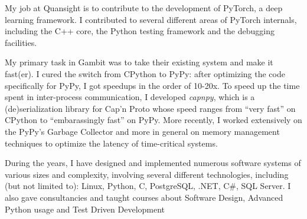 \documentclass[11pt,a4paper]{moderncv}
\begin{document}
 {My job at Quansight is to
  contribute to the development of PyTorch, a deep learning framework. I
  contributed to several different areas of PyTorch internals, including the
  C++ core, the Python testing framework and the debugging facilities.}

 {My primary task in
  Gambit was to take their existing system and make it fast(er).  I cured the
  switch from CPython to PyPy: after optimizing the code specifically for
  PyPy, I got speedups in the order of 10-20x.  To speed up the time spent in
  inter-process communication, I developed \emph{capnpy}, which is a
  (de)serialization library for Cap'n Proto whose speed ranges from ``very
  fast'' on CPython to ``embarassingly fast'' on PyPy.  More recently, I
  worked extensively on the PyPy's Garbage Collector and more in general on
  memory management techniques to optimize the latency of time-critical
  systems.}

 {During the years, I have designed and implemented numerous
  software systems of various sizes and complexity, involving several
  different technologies, including (but not limited to): Linux, Python, C,
  PostgreSQL, .NET, C\#, SQL Server.  I also gave consultancies and taught
  courses about Software Design, Advanced Python usage and Test Driven
  Development}
\cvitem{}{}

\cvitem{}{}

\cvitem{}{}

\cvitem{}{}

\end{document}
